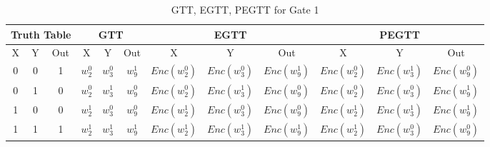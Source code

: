\documentclass[times]{article}
\begin{document}
	\begin{table}
		\centering
		\caption{GTT, EGTT, PEGTT for Gate 1}
		\label{tab:gtt1}
		\begin{adjustbox}{width=1\textwidth}
		\begin{tabular}{|c|c|c||c|c|c||c|c|c||c|c|c|}
			\hline
			\multicolumn{3}{|c||}{Truth Table} 		& 
				\multicolumn{3}{|c||}{GTT}			& 
					\multicolumn{3}{|c||}{EGTT} 		& 
						\multicolumn{3}{|c|}{PEGTT} \\
			\hline
			\hline
			X & Y & Out	& 
				X & Y & Out	& 
					X & Y & Out	& 
						X & Y & Out	\\
			\hline
			0 & 0 & 1 	&
				$w_{2}^0$	& $w_{3}^0$	& $w_{9}^1$	& 
					$Enc(w_{2}^0)$	& $Enc(w_{3}^0)$	& $Enc(w_{9}^1)$ &
						$Enc(w_{2}^0)$	& $Enc(w_{3}^1)$	& $Enc(w_{9}^0)$ \\
			\hline
			0 & 1 & 0 	&
				$w_{2}^0$	& $w_{3}^1$	& $w_{9}^0$	& 
					$Enc(w_{2}^0)$	& $Enc(w_{3}^1)$	& $Enc(w_{9}^0)$ &
						$Enc(w_{2}^0)$	& $Enc(w_{3}^0)$	& $Enc(w_{9}^1)$ \\
			\hline
			1 & 0 & 0 	&
				$w_{2}^1$	& $w_{3}^0$	& $w_{9}^0$	& 
					$Enc(w_{2}^1)$	& $Enc(w_{3}^0)$	& $Enc(w_{9}^0)$ &
						$Enc(w_{2}^1)$	& $Enc(w_{3}^1)$	& $Enc(w_{9}^1)$ \\
			\hline
			1 & 1 & 1 	&
				$w_{2}^1$	& $w_{3}^1$	& $w_{9}^1$	& 
					$Enc(w_{2}^1)$	& $Enc(w_{3}^1)$	& $Enc(w_{9}^1)$ &
						$Enc(w_{2}^1)$	& $Enc(w_{3}^0)$	& $Enc(w_{9}^0)$ \\
			\hline
		\end{tabular}
		\end{adjustbox}
	\end{table}
\end{document}
